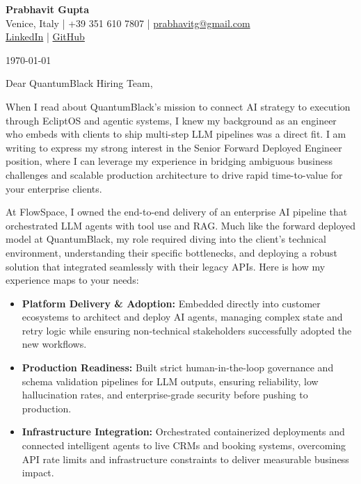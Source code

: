 \documentclass[11pt,a4paper]{article}
\begin{document}
\begin{center}
    {\huge \textbf{Prabhavit Gupta}} \\[0.5em]
    Venice, Italy | +39 351 610 7807 | \href{mailto:prabhavitg@gmail.com}{prabhavitg@gmail.com} \\
    \href{https://www.linkedin.com/in/prabhavit/}{LinkedIn} | \href{https://github.com/prab-gupta}{GitHub}
\end{center}

\vspace{2em}

\today

\vspace{1em}

Dear QuantumBlack Hiring Team,

\vspace{1em}

When I read about QuantumBlack's mission to connect AI strategy to execution through EcliptOS and agentic systems, I knew my background as an engineer who embeds with clients to ship multi-step LLM pipelines was a direct fit. I am writing to express my strong interest in the Senior Forward Deployed Engineer position, where I can leverage my experience in bridging ambiguous business challenges and scalable production architecture to drive rapid time-to-value for your enterprise clients.

At FlowSpace, I owned the end-to-end delivery of an enterprise AI pipeline that orchestrated LLM agents with tool use and RAG. Much like the forward deployed model at QuantumBlack, my role required diving into the client's technical environment, understanding their specific bottlenecks, and deploying a robust solution that integrated seamlessly with their legacy APIs. Here is how my experience maps to your needs:

\begin{itemize}
    \item \textbf{Platform Delivery \& Adoption:} Embedded directly into customer ecosystems to architect and deploy AI agents, managing complex state and retry logic while ensuring non-technical stakeholders successfully adopted the new workflows.
    \item \textbf{Production Readiness:} Built strict human-in-the-loop governance and schema validation pipelines for LLM outputs, ensuring reliability, low hallucination rates, and enterprise-grade security before pushing to production.
    \item \textbf{Infrastructure Integration:} Orchestrated containerized deployments and connected intelligent agents to live CRMs and booking systems, overcoming API rate limits and infrastructure constraints to deliver measurable business impact.
\end{itemize}
\end{document}
